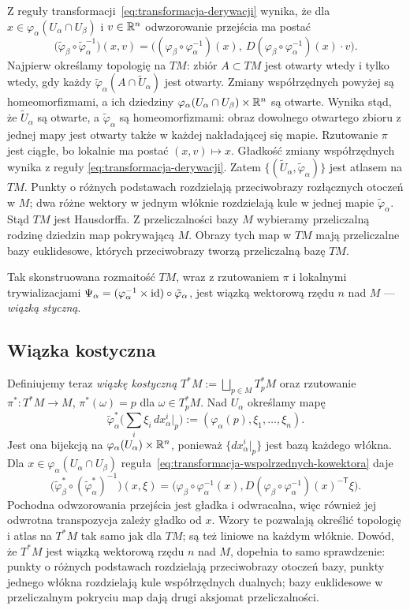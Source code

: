 Z reguły transformacji~\eqref{eq:transformacja-derywacji} wynika,
że dla $x\in\varphi_\alpha(U_\alpha\cap U_\beta)$ i $v\in\mathbb{R}^n$
odwzorowanie przejścia ma postać
\[
\big(\tilde\varphi_\beta\circ\tilde\varphi_\alpha^{-1}\big)(x,v)=\Big(
(\varphi_\beta\circ\varphi_\alpha^{-1})(x),\ D(\varphi_\beta\circ\varphi_\alpha^{-1})(x)
\cdot v\Big).
\]
Najpierw określamy topologię na $TM$: zbiór $A\subset TM$
jest otwarty wtedy i tylko wtedy, gdy każdy
$\tilde\varphi_\alpha(A\cap\tilde U_\alpha)$ jest otwarty.
Zmiany współrzędnych powyżej są homeomorfizmami, a ich dziedziny
$\varphi_\alpha(U_\alpha\cap U_\beta)\times\mathbb{R}^n$ są otwarte.
Wynika stąd, że $\tilde U_\alpha$ są otwarte, a
$\tilde\varphi_\alpha$ są homeomorfizmami: obraz dowolnego otwartego
zbioru z jednej mapy jest otwarty także w każdej nakładającej się mapie.
Rzutowanie $\pi$ jest ciągłe, bo lokalnie ma postać $(x,v)\mapsto x$.
Gładkość zmiany współrzędnych wynika z reguły
\eqref{eq:transformacja-derywacji}. Zatem $\{(\tilde
U_\alpha,\tilde\varphi_\alpha)\}$ jest atlasem na $TM$. Punkty o różnych
podstawach rozdzielają przeciwobrazy rozłącznych otoczeń w $M$;
dwa różne wektory w jednym włóknie rozdzielają kule w jednej mapie
$\tilde\varphi_\alpha$. Stąd $TM$ jest Hausdorffa. Z przeliczalności
bazy $M$ wybieramy przeliczalną rodzinę dziedzin map pokrywającą $M$.
Obrazy tych map w $TM$ mają przeliczalne bazy euklidesowe, których
przeciwobrazy tworzą przeliczalną bazę $TM$.

Tak skonstruowana rozmaitość $TM$, wraz z rzutowaniem $\pi$ i lokalnymi trywializacjami
$\Psi_\alpha=(\varphi_\alpha^{-1}\times\mathrm{id})\circ\tilde\varphi_\alpha$, jest wiązką
wektorową rzędu $n$ nad $M$ — \emph{wiązką styczną}.

\subsection*{Wiązka kostyczna}

Definiujemy teraz \emph{wiązkę kostyczną}
$T^*M:=\bigsqcup_{p\in M}T_p^*M$ oraz rzutowanie
$\pi^*\colon T^*M\to M$, $\pi^*(\omega)=p$ dla $\omega\in T_p^*M$.
Nad $U_\alpha$ określamy mapę
\[
\tilde\varphi_\alpha^*\Big(\sum_i\xi_i\,dx^i_\alpha|_p\Big)
:=(\varphi_\alpha(p),\xi_1,\ldots,\xi_n).
\]
Jest ona bijekcją na $\varphi_\alpha(U_\alpha)\times\mathbb{R}^n$,
ponieważ $\{dx^i_\alpha|_p\}$ jest bazą każdego włókna.
Dla $x\in\varphi_\alpha(U_\alpha\cap U_\beta)$
reguła~\eqref{eq:transformacja-wspolrzednych-kowektora} daje
\[
\big(\tilde\varphi_\beta^*\circ(\tilde\varphi_\alpha^*)^{-1}\big)(x,\xi)
=\Big(\varphi_\beta\circ\varphi_\alpha^{-1}(x),
D(\varphi_\beta\circ\varphi_\alpha^{-1})(x)^{-\mathsf T}\xi\Big).
\]
Pochodna odwzorowania przejścia jest gładka i odwracalna,
więc również jej odwrotna transpozycja zależy gładko od $x$.
Wzory te pozwalają określić topologię i atlas na $T^*M$
tak samo jak dla $TM$; są też liniowe na każdym włóknie.
Dowód, że $T^*M$ jest wiązką wektorową rzędu $n$ nad $M$,
dopełnia to samo sprawdzenie:
punkty o różnych podstawach rozdzielają przeciwobrazy otoczeń bazy,
punkty jednego włókna rozdzielają kule współrzędnych dualnych; bazy
euklidesowe w przeliczalnym pokryciu map dają drugi aksjomat przeliczalności.

